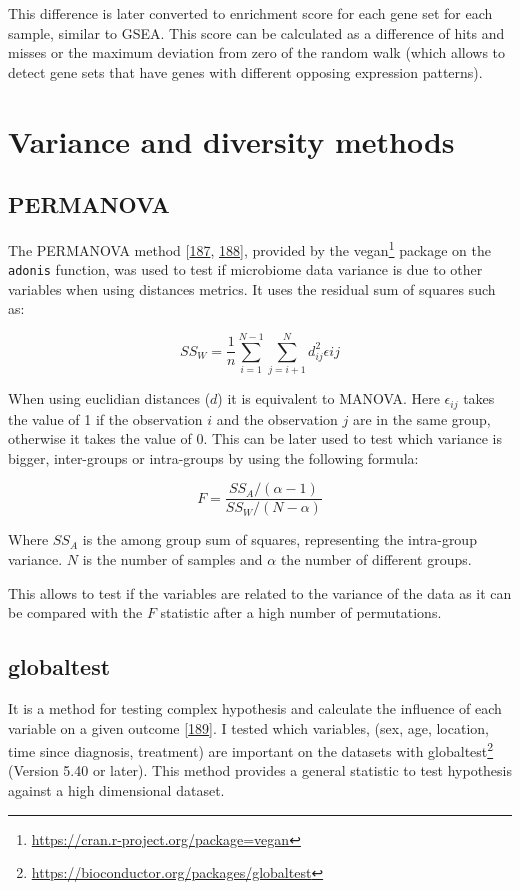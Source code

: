 \documentclass[
  a4paper,
]{book}
\DeclareRobustCommand{\href}[2]{#2\footnote{\url{#1}}}
\begin{document}
This difference is later converted to enrichment score for each gene set for each sample, similar to GSEA.
This score can be calculated as a difference of hits and misses or the maximum deviation from zero of the random walk (which allows to detect gene sets that have genes with different opposing expression patterns).

\hypertarget{variance}{%
\section{Variance and diversity methods}\label{variance}}

\hypertarget{permanova}{%
\subsection{PERMANOVA}\label{permanova}}

The PERMANOVA method {[}\protect\hyperlink{ref-anderson2001}{187}, \protect\hyperlink{ref-warton2012}{188}{]}, provided by the \href{https://cran.r-project.org/package=vegan}{vegan} package on the \texttt{adonis} function, was used to test if microbiome data variance is due to other variables when using distances metrics.
It uses the residual sum of squares such as:

\[
SS_W = \frac{1}{n} \sum_{i=1}^{N-1}\sum_{j=i+1}^N d_{ij}^2\epsilon{ij} 
\]

When using euclidian distances (\(d\)) it is equivalent to MANOVA.
Here \(\epsilon_{ij}\) takes the value of 1 if the observation \(i\) and the observation \(j\) are in the same group, otherwise it takes the value of 0.
This can be later used to test which variance is bigger, inter-groups or intra-groups by using the following formula:

\[
F = \dfrac{SS_A/(\alpha -1)}{SS_W/(N-\alpha)}
\]

Where \(SS_A\) is the among group sum of squares, representing the intra-group variance.
\(N\) is the number of samples and \(\alpha\) the number of different groups.

This allows to test if the variables are related to the variance of the data as it can be compared with the \(F\) statistic after a high number of permutations.

\hypertarget{globaltest}{%
\subsection{globaltest}\label{globaltest}}

It is a method for testing complex hypothesis and calculate the influence of each variable on a given outcome {[}\protect\hyperlink{ref-goeman2006}{189}{]}.
I tested which variables, (sex, age, location, time since diagnosis, treatment) are important on the datasets with \href{https://bioconductor.org/packages/globaltest}{globaltest} (Version 5.40 or later).
This method provides a general statistic to test hypothesis against a high dimensional dataset.
\end{document}
